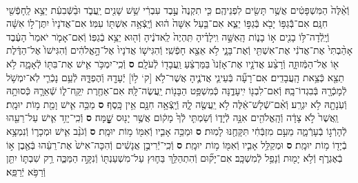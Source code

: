 \documentclass[twoside, openany, parskip=half, 11pt]{book}
\begin{document}
\begin{footnotesize}
\begin{multicols}{2}
\\
וְֿאֵ֨לֶּה֙ הַמִּשְׁפָּטִ֔ים אֲשֶׁ֥ר תָּשִׂ֖ים לִפְנֵיהֶֽם׃ כִּ֤י תִקְנֶה֙ עֶ֣בֶד עִבְרִ֔י שֵׁ֥שׁ שָׁנִ֖ים יַֽעֲבֹ֑ד וּבַ֨שְּֿׁבִעִ֔ת יֵצֵ֥א לַֽחָפְֿשִׁ֖י חִנָּֽם׃ אִם־בְּֿֿגַפּ֥וֹ יָבֹ֖א בְּֿגַפּ֣וֹ יֵצֵ֑א אִם־בַּ֤עַל אִשָּׁה֙ ה֔וּא וְֿיָֽצְֿאָ֥ה אִשְׁתּ֖וֹ עִמּֽוֹ׃ אִם־אֲדֹנָיו֙ יִתֶּן־ל֣וֹ אִשָּׁ֔ה וְֿיָֽלְֿדָה־לּ֥וֹ בָנִ֖ים א֣וֹ בָנ֑וֹת הָֽאִשָּׁ֣ה וִֽילָדֶ֗יהָ תִּֽהְיֶה֙ לַֽאדֹנֶ֔יהָ וְֿה֖וּא יֵצֵ֥א בְֿגַפּֽוֹ׃ וְֿאִם־אָמֹ֤ר יֹאמַר֙ הָעֶ֔בֶד אָהַ֨בְתִּי֙ אֶת־אֲדֹנִ֔י אֶת־אִשְׁתִּ֖י וְֿאֶת־בָּנָ֑י לֹ֥א אֵצֵ֖א חָפְֿשִֽׁי׃ וְֿהִגִּישׁ֤וֹ אֲדֹנָיו֙ אֶל־הָ֣אֱלֹהִ֔ים וְֿהִגִּישׁוֹ֙ אֶל־הַדֶּ֔לֶת א֖וֹ אֶל־הַמְּֿזוּזָ֑ה וְֿרָצַ֨ע אֲדֹנָ֤יו אֶת־אָזְֿנוֹ֙ בַּמַּרְצֵ֔עַ וַֽעֲבָד֖וֹ לְֿעֹלָֽם׃ \textbf{ס}  וְֿכִֽי־יִמְכֹּ֥ר אִ֛ישׁ אֶת־בִּתּ֖וֹ לְֿאָמָ֑ה לֹ֥א תֵצֵ֖א כְּֿצֵ֥את הָֽעֲבָדִֽים׃ אִם־רָעָ֞ה בְּֿעֵינֵ֧י אֲדֹנֶ֛יהָ אֲשֶׁר־לֹ֥א [ק‘ ל֥וֹ] יְֿעָדָ֖הּ וְֿהֶפְדָּ֑הּ לְֿעַ֥ם נָכְֿרִ֛י לֹֽא־יִמְשֹׁ֥ל לְֿמָכְֿרָ֖הּ בְּֿבִגְדוֹ־בָֽהּ׃ וְֿאִם־לִבְנ֖וֹ יִֽיעָדֶ֑נָּה כְּֿמִשְׁפַּ֥ט הַבָּנ֖וֹת יַֽעֲשֶׂה־לָּֽהּ׃ אִם־אַחֶ֖רֶת יִֽקַּֽח־ל֑וֹ שְֿׁאֵרָ֛הּ כְּֿסוּתָ֥הּ וְֿעֹֽנָתָ֖הּ לֹ֥א יִגְרָֽע׃ וְֿאִ֨ם־שְֿׁלָשׁ־אֵ֔לֶּה לֹ֥א יַֽעֲשֶׂ֖ה לָ֑הּ וְֿיָֽצְֿאָ֥ה חִנָּ֖ם אֵ֥ין כָּֽסֶף׃ \textbf{ס}  מַכֵּ֥ה אִ֛ישׁ וָמֵ֖ת מ֥וֹת יוּמָֽת׃ וַֽאֲשֶׁר֙ לֹ֣א צָדָ֔ה וְֿהָֽאֱלֹהִ֖ים אִנָּ֣ה לְֿיָד֑וֹ וְֿשַׂמְתִּ֤י לְֿךָ֙ מָק֔וֹם אֲשֶׁ֥ר יָנ֖וּס שׇׇׇׇׇׇׇׇָֽׁמָּה׃ \textbf{ס} וְֿכִֽי־יָזִ֥ד אִ֛ישׁ עַל־רֵעֵ֖הוּ לְֿהָרְֿג֣וֹ בְֿעָרְֿמָ֑ה מֵעִ֣ם מִזְבְּֿחִ֔י תִּקָּחֶ֖נּוּ לָמֽוּת׃ \textbf{ס} וּמַכֵּ֥ה אָבִ֛יו וְֿאִמּ֖וֹ מ֥וֹת יוּמָֽת׃ \textbf{ס} וְֿגֹנֵ֨ב אִ֧ישׁ וּמְכָר֛וֹ וְֿנִמְצָ֥א בְֿיָד֖וֹ מ֥וֹת יוּמָֽת׃ \textbf{ס} וּמְקַלֵּ֥ל אָבִ֛יו וְֿאִמּ֖וֹ מ֥וֹת יוּמָֽת׃ \textbf{ס} וְֿכִֽי־יְֿֿרִיבֻ֣ן אֲנָשִׁ֔ים וְֿהִכָּה־אִישׁ֙ אֶת־רֵעֵ֔הוּ בְּֿאֶ֖בֶן א֣וֹ בְֿאֶגְרֹ֑ף וְֿלֹ֥א יָמ֖וּת וְֿנָפַ֥ל לְֿמִשְׁכָּֽב׃ אִם־יָק֞וּם וְֿהִתְהַלֵּ֥ךְ בַּח֛וּץ עַל־מִשְׁעַנְתּ֖וֹ וְֿנִקָּ֣ה הַמַּכֶּ֑ה רַ֥ק שִׁבְתּ֛וֹ יִתֵּ֖ן וְֿרַפֹּ֥א יְֿרַפֵּֽא׃


\end{multicols}
\end{footnotesize}
\end{document}
